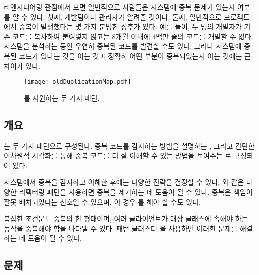 \documentclass[a4paper,10pt,twoside]{book}
\begin{document}
리엔지니어링 관점에서 보면 일반적으로 사람들은 시스템에 중복 문제가 있는지 여부를 알 수 있다. 첫째, 개발팀이나 관리자가 알려줄 것이다. 둘째, 일반적으로 프로젝트에서 중복이 발생했다는 몇 가지 분명한 징후가 있다. 예를 들어, 두 명의 개발자가 기존 코드를 복사하여 붙여넣지 않고는 8개월 이내에 4백만 줄의 코드를 개발할 수 없다. 시스템을 분석하는 동안 우연히 중복된 코드를 발견할 수도 있다. 그러나 시스템에 중복된 코드가 있다는 것을 아는 것과 정확히 어떤 부분이 중복되었는지 아는 것에는 큰 차이가 있다. 

\begin{figure}[h]
\begin{center}
\texttt{[image: oldDuplicationMap.pdf]}
\caption{를 지원하는 두 가지 패턴.}
\end{center}
\end{figure}

\subsection*{개요}

는 두 가지 패턴으로 구성된다. 중복 코드를 감지하는 방법을 설명하는 , 그리고 간단한 이차원적 시각화를 통해 중복 코드를 더 잘 이해할 수 있는 방법을 보여주는 로 구성되어 있다.

시스템에서 중복을 감지하고 이해한 후에는 다양한 전략을 결정할 수 있다. 와 같은 다양한 리팩터링 패턴을 사용하면 중복을 제거하는 데 도움이 될 수 있다. 중복은 책임이 잘못 배치되었다는 신호일 수 있으며, 이 경우 를 해야 할 수도 있다. 

복잡한 조건문도 중복의 한 형태이며, 여러 클라이언트가 대상 클래스에 속해야 하는 동작을 중복해야 함을 나타낼 수 있다. 패턴 클러스터 을 사용하면 이러한 문제를 해결하는 데 도움이 될 수 있다.



\subsection*{문제}
\end{document}
